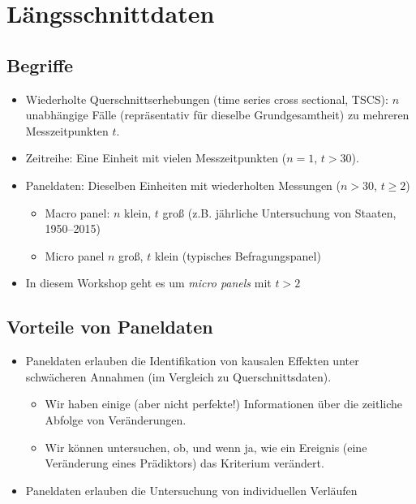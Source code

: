 \documentclass[]{book}
\providecommand{\tightlist}{%
  \setlength{\itemsep}{0pt}\setlength{\parskip}{0pt}}
\begin{document}
\hypertarget{luxe4ngsschnittdaten}{%
\section{Längsschnittdaten}\label{luxe4ngsschnittdaten}}

\hypertarget{begriffe}{%
\subsection*{Begriffe}\label{begriffe}}

\begin{itemize}
\tightlist
\item
  Wiederholte Querschnittserhebungen (time series cross sectional, TSCS): \(n\) unabhängige Fälle (repräsentativ für dieselbe Grundgesamtheit) zu mehreren Messzeitpunkten \(t\).
\item
  Zeitreihe: Eine Einheit mit vielen Messzeitpunkten (\(n = 1\), \(t > 30\)).
\item
  Paneldaten: Dieselben Einheiten mit wiederholten Messungen (\(n > 30\), \(t \ge 2\))

  \begin{itemize}
  \tightlist
  \item
    Macro panel: \(n\) klein, \(t\) groß (z.B. jährliche Untersuchung von Staaten, 1950--2015)
  \item
    Micro panel \(n\) groß, \(t\) klein (typisches Befragungspanel)
  \end{itemize}
\item
  In diesem Workshop geht es um \emph{micro panels} mit \(t > 2\)
\end{itemize}

\hypertarget{vorteile-von-paneldaten}{%
\subsection*{Vorteile von Paneldaten}\label{vorteile-von-paneldaten}}

\begin{itemize}
\tightlist
\item
  Paneldaten erlauben die Identifikation von kausalen Effekten unter schwächeren Annahmen (im Vergleich zu Querschnittsdaten).

  \begin{itemize}
  \tightlist
  \item
    Wir haben einige (aber nicht perfekte!) Informationen über die zeitliche Abfolge von Veränderungen.
  \item
    Wir können untersuchen, ob, und wenn ja, wie ein Ereignis (eine Veränderung eines Prädiktors) das Kriterium verändert.
  \end{itemize}
\item
  Paneldaten erlauben die Untersuchung von individuellen Verläufen
\end{itemize}
\end{document}
